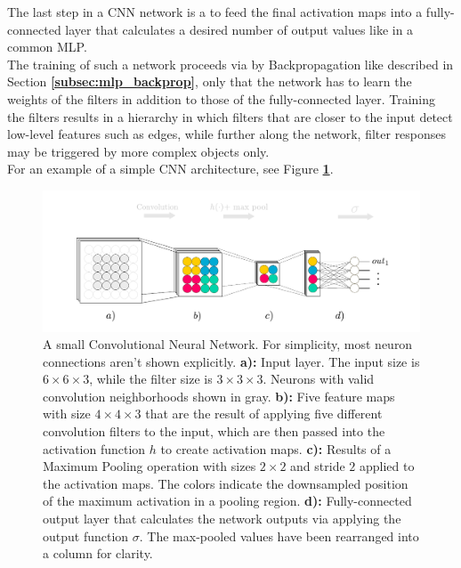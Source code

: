The last step in a CNN network is a to feed the final activation maps into a fully-connected layer that calculates a desired number of output values like in a common MLP. \cite[pp. 330-345]{deeplearning_book}\\

\noindent The training of such a network proceeds via by Backpropagation like described in Section \textbf{\ref{subsec:mlp_backprop}}, only that the network has to learn the weights of the filters in addition to those of the fully-connected layer. Training the filters results in a hierarchy in which filters that are closer to the input detect low-level features such as edges, while further along the network, filter responses may be triggered by more complex objects only.\\

For an example of a simple CNN architecture, see Figure \textbf{\ref{fig:convnet}}.

\begin {figure}[!ht]
	\begin{flushleft}
		\includegraphics[scale=0.75]{img/fig_convnet}
	\end{flushleft}
	\caption[A small Convolutional Neural Network.]{A small Convolutional Neural Network. For simplicity, most neuron connections aren't shown explicitly. \textbf{a):} Input layer. The input size is $6 \times 6 \times 3$, while the filter size is $3 \times 3 \times 3$. Neurons with valid convolution neighborhoods shown in gray. \textbf{b):} Five feature maps with size $4 \times 4 \times 3$ that are the result of applying five different convolution filters to the input, which are then passed into the activation function $h$ to create activation maps. \textbf{c):} Results of a Maximum Pooling operation with sizes $2 \times 2$ and stride $2$ applied to the activation maps. The colors indicate the downsampled position of the maximum activation in a pooling region. \textbf{d):} Fully-connected output layer that calculates the network outputs via applying the output function $\sigma$. The max-pooled values have been rearranged into a column for clarity.}
	\label{fig:convnet}
\end {figure}


